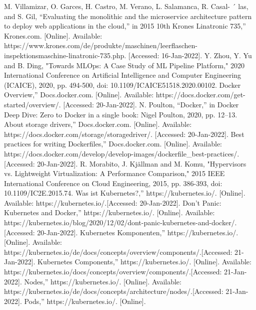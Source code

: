 \begin{thebibliography}{10}
   M. Villamizar, O. Garces, H. Castro, M. Verano, L. Salamanca, R. Casal- ´
  las, and S. Gil, “Evaluating the monolithic and the microservice architecture pattern to deploy web applications in the cloud,” in 2015 10th
   Krones Linatronic 735,” Krones.com. [Online].
  Available: https://www.krones.com/de/produkte/maschinen/leerflaschen-inspektionsmaschine-linatronic-735.php. [Accessed: 16-Jan-2022].
   Y. Zhou, Y. Yu and B. Ding, "Towards MLOps: A Case Study of ML Pipeline Platform," 2020 International Conference on Artificial Intelligence and Computer Engineering (ICAICE), 2020, pp. 494-500, doi: 10.1109/ICAICE51518.2020.00102.
   Docker Overview,” Docs.docker.com. [Online].
  Available: https://docs.docker.com/get-started/overview/. [Accessed: 20-Jan-2022].
  N. Poulton, “Docker,” in Docker Deep Dive: Zero to Docker in a single book: Nigel Poulton, 2020, pp. 12–13. 
   About storage drivers,” Docs.docker.com. [Online].
  Available: https://docs.docker.com/storage/storagedriver/. [Accessed: 20-Jan-2022].
   Best practices for writing Dockerfiles,” Docs.docker.com. [Online]. 
  Available: https://docs.docker.com/develop/develop-images/dockerfile\_best-practices/.[Accessed: 20-Jan-2022].
   R. Morabito, J. Kjällman and M. Komu, "Hypervisors vs. Lightweight Virtualization: A Performance Comparison," 2015 IEEE International Conference on Cloud Engineering, 2015, pp. 386-393, doi: 10.1109/IC2E.2015.74.
   Was ist Kubernetes?,” https://kubernetes.io/. [Online]. 
  Available: https://kubernetes.io/.[Accessed: 20-Jan-2022].
   Don't Panic: Kubernetes and Docker,” https://kubernetes.io/. [Online]. 
  Available: https://kubernetes.io/blog/2020/12/02/dont-panic-kubernetes-and-docker/.[Accessed: 20-Jan-2022].
   Kubernetes Komponenten,” https://kubernetes.io/. [Online]. 
  Available: https://kubernetes.io/de/docs/concepts/overview/components/.[Accessed: 21-Jan-2022].
   Kubernetes Components,” https://kubernetes.io/. [Online]. 
  Available: https://kubernetes.io/docs/concepts/overview/components/.[Accessed: 21-Jan-2022].
   Nodes,” https://kubernetes.io/. [Online]. 
  Available: https://kubernetes.io/de/docs/concepts/architecture/nodes/.[Accessed: 21-Jan-2022].
   Pods,” https://kubernetes.io/. [Online]. 

\end{thebibliography}
